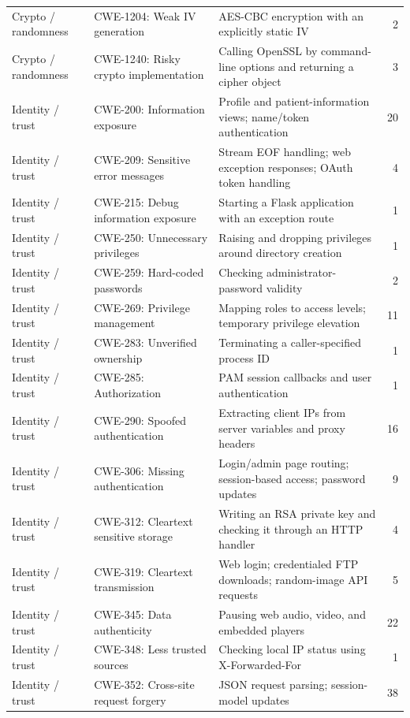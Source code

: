 \begin{longtable}{@{}>{\raggedright\arraybackslash}p{.13\linewidth} >{\raggedright\arraybackslash}p{.25\linewidth} >{\raggedright\arraybackslash}p{} r@{}}
Crypto / randomness & CWE-1204: Weak IV generation & AES-CBC encryption with an explicitly static IV & 2 \\
Crypto / randomness & CWE-1240: Risky crypto implementation & Calling OpenSSL by command-line options and returning a cipher object & 3 \\
\midrule
Identity / trust & CWE-200: Information exposure & Profile and patient-information views; name/token authentication & 20 \\
Identity / trust & CWE-209: Sensitive error messages & Stream EOF handling; web exception responses; OAuth token handling & 4 \\
Identity / trust & CWE-215: Debug information exposure & Starting a Flask application with an exception route & 1 \\
Identity / trust & CWE-250: Unnecessary privileges & Raising and dropping privileges around directory creation & 1 \\
Identity / trust & CWE-259: Hard-coded passwords & Checking administrator-password validity & 2 \\
Identity / trust & CWE-269: Privilege management & Mapping roles to access levels; temporary privilege elevation & 11 \\
Identity / trust & CWE-283: Unverified ownership & Terminating a caller-specified process ID & 1 \\
Identity / trust & CWE-285: Authorization & PAM session callbacks and user authentication & 1 \\
Identity / trust & CWE-290: Spoofed authentication & Extracting client IPs from server variables and proxy headers & 16 \\
Identity / trust & CWE-306: Missing authentication & Login/admin page routing; session-based access; password updates & 9 \\
Identity / trust & CWE-312: Cleartext sensitive storage & Writing an RSA private key and checking it through an HTTP handler & 4 \\
Identity / trust & CWE-319: Cleartext transmission & Web login; credentialed FTP downloads; random-image API requests & 5 \\
Identity / trust & CWE-345: Data authenticity & Pausing web audio, video, and embedded players & 22 \\
Identity / trust & CWE-348: Less trusted sources & Checking local IP status using X-Forwarded-For & 1 \\
Identity / trust & CWE-352: Cross-site request forgery & JSON request parsing; session-model updates & 38 \\

\end{longtable}
